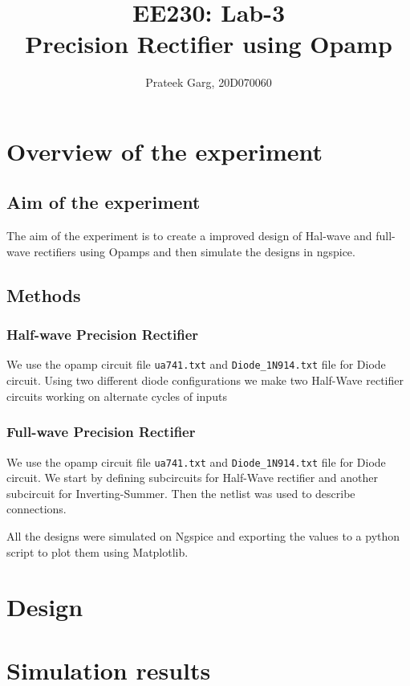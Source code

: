 \documentclass[12pt]{article}
\title{EE230: Lab-3\\
Precision Rectifier using Opamp}
\author{Prateek Garg, 20D070060}
\begin{document}
\noindent
\maketitle

\section{Overview of the experiment} %

\subsection{Aim of the experiment}%
The aim of the experiment is to create a improved design of Hal-wave and full-wave rectifiers using Opamps 
and then simulate the designs in ngspice.
\subsection{Methods}
\subsubsection{Half-wave Precision Rectifier}
We use the opamp circuit file \texttt{ua741.txt} and \texttt{Diode\_1N914.txt} file for Diode circuit. 
Using two different diode configurations we make two Half-Wave rectifier circuits working on alternate cycles of inputs 
\subsubsection{Full-wave Precision Rectifier}
We use the opamp circuit file \texttt{ua741.txt} and \texttt{Diode\_1N914.txt} file for Diode circuit. 
We start by defining subcircuits for Half-Wave rectifier and another subcircuit for Inverting-Summer. Then the netlist was used to describe connections.


All the designs were simulated on Ngspice and exporting the values to a python script to plot them using Matplotlib.
\section{Design}




\section{Simulation results}
\end{document}
